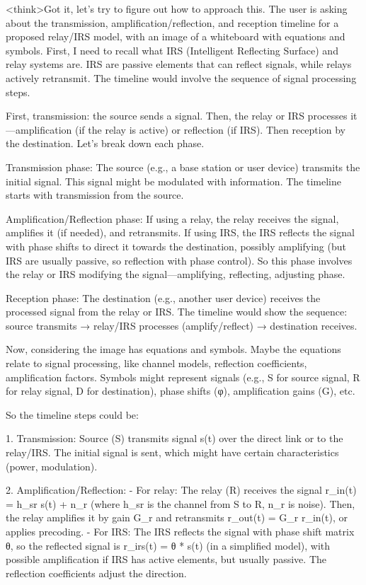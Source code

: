 <think>Got it, let's try to figure out how to approach this. The user is asking about the transmission, amplification/reflection, and reception timeline for a proposed relay/IRS model, with an image of a whiteboard with equations and symbols. First, I need to recall what IRS (Intelligent Reflecting Surface) and relay systems are. IRS are passive elements that can reflect signals, while relays actively retransmit. The timeline would involve the sequence of signal processing steps.

First, transmission: the source sends a signal. Then, the relay or IRS processes it—amplification (if the relay is active) or reflection (if IRS). Then reception by the destination. Let's break down each phase.

Transmission phase: The source (e.g., a base station or user device) transmits the initial signal. This signal might be modulated with information. The timeline starts with transmission from the source.

Amplification/Reflection phase: If using a relay, the relay receives the signal, amplifies it (if needed), and retransmits. If using IRS, the IRS reflects the signal with phase shifts to direct it towards the destination, possibly amplifying (but IRS are usually passive, so reflection with phase control). So this phase involves the relay or IRS modifying the signal—amplifying, reflecting, adjusting phase.

Reception phase: The destination (e.g., another user device) receives the processed signal from the relay or IRS. The timeline would show the sequence: source transmits → relay/IRS processes (amplify/reflect) → destination receives.

Now, considering the image has equations and symbols. Maybe the equations relate to signal processing, like channel models, reflection coefficients, amplification factors. Symbols might represent signals (e.g., S for source signal, R for relay signal, D for destination), phase shifts (φ), amplification gains (G), etc.

So the timeline steps could be:

1. Transmission: Source (S) transmits signal s(t) over the direct link or to the relay/IRS. The initial signal is sent, which might have certain characteristics (power, modulation).

2. Amplification/Reflection: 
   - For relay: The relay (R) receives the signal r_in(t) = h_sr s(t) + n_r (where h_sr is the channel from S to R, n_r is noise). Then, the relay amplifies it by gain G_r and retransmits r_out(t) = G_r r_in(t), or applies precoding. 
   - For IRS: The IRS reflects the signal with phase shift matrix θ, so the reflected signal is r_irs(t) = θ * s(t) (in a simplified model), with possible amplification if IRS has active elements, but usually passive. The reflection coefficients adjust the direction.

